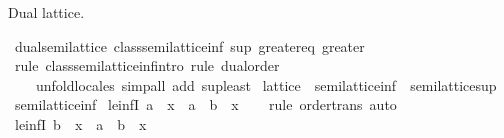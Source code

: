 \begin{isabellebody}
%
\begin{isamarkuptext}%
Dual lattice.%
\end{isamarkuptext}\isamarkuptrue%
\isamarkupfalse%
\ dual{\isacharunderscore}{\kern0pt}semilattice{\isacharcolon}{\kern0pt}\ {\isachardoublequoteopen}class{\isachardot}{\kern0pt}semilattice{\isacharunderscore}{\kern0pt}inf\ sup\ greater{\isacharunderscore}{\kern0pt}eq\ greater{\isachardoublequoteclose}\isanewline
%
\isadelimproof
\ \ %
\endisadelimproof
%
\isatagproof
{}\isamarkupfalse%
\ {\isacharparenleft}{\kern0pt}rule\ class{\isachardot}{\kern0pt}semilattice{\isacharunderscore}{\kern0pt}inf{\isachardot}{\kern0pt}intro{\isacharcomma}{\kern0pt}\ rule\ dual{\isacharunderscore}{\kern0pt}order{\isacharparenright}{\kern0pt}\isanewline
\ \ \ \ {\isacharparenleft}{\kern0pt}unfold{\isacharunderscore}{\kern0pt}locales{\isacharcomma}{\kern0pt}\ simp{\isacharunderscore}{\kern0pt}all\ add{\isacharcolon}{\kern0pt}\ sup{\isacharunderscore}{\kern0pt}least{\isacharparenright}{\kern0pt}%
\endisatagproof
{\isafoldproof}%
%
\isadelimproof
\isanewline
%
\endisadelimproof
\isanewline
{}\isamarkupfalse%
\isanewline
\isanewline
{}\isamarkupfalse%
\ lattice\ {\isacharequal}{\kern0pt}\ semilattice{\isacharunderscore}{\kern0pt}inf\ {\isacharplus}{\kern0pt}\ semilattice{\isacharunderscore}{\kern0pt}sup%
\isadelimdocument
%
\endisadelimdocument
%
\isatagdocument
%
\isamarkuptrue%
%
\endisatagdocument
{\isafolddocument}%
%
\isadelimdocument
%
\endisadelimdocument
{}\isamarkupfalse%
\ semilattice{\isacharunderscore}{\kern0pt}inf\isanewline
{}\isanewline
\isanewline
{}\isamarkupfalse%
\ le{\isacharunderscore}{\kern0pt}infI{}{\isacharcolon}{\kern0pt}\ {\isachardoublequoteopen}a\ {\isasymle}\ x\ {\isasymLongrightarrow}\ a\ {\isasymsqinter}\ b\ {\isasymle}\ x{\isachardoublequoteclose}\isanewline
%
\isadelimproof
\ \ %
\endisadelimproof
%
\isatagproof
{}\isamarkupfalse%
\ {\isacharparenleft}{\kern0pt}rule\ order{\isacharunderscore}{\kern0pt}trans{\isacharparenright}{\kern0pt}\ auto%
\endisatagproof
{\isafoldproof}%
%
\isadelimproof
\isanewline
%
\endisadelimproof
\isanewline
{}\isamarkupfalse%
\ le{\isacharunderscore}{\kern0pt}infI{}{\isacharcolon}{\kern0pt}\ {\isachardoublequoteopen}b\ {\isasymle}\ x\ {\isasymLongrightarrow}\ a\ {\isasymsqinter}\ b\ {\isasymle}\ x{\isachardoublequoteclose}\isanewline
%
\isadelimproof
\ \ %
\endisadelimproof

\end{isabellebody}
